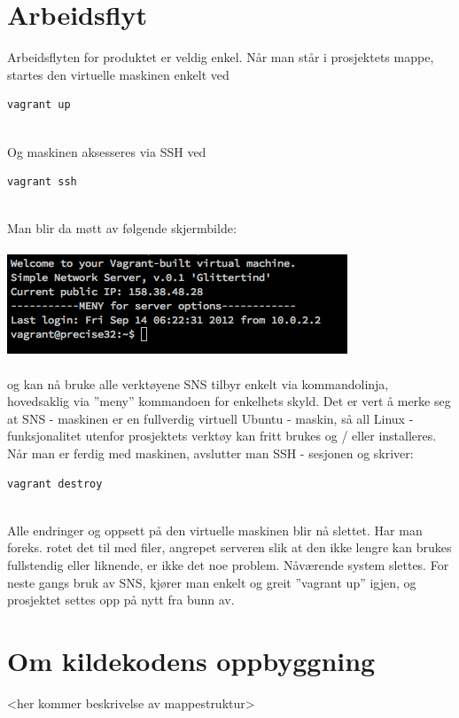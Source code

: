 \documentclass{article}
\begin{document}
\section{Arbeidsflyt}
Arbeidsflyten for produktet er veldig enkel. Når man står i prosjektets mappe, startes den virtuelle maskinen enkelt ved \\
\begin{lstlisting}
vagrant up
\end{lstlisting}
\\ 
Og maskinen aksesseres via SSH ved
\begin{lstlisting}
vagrant ssh
\end{lstlisting}
\\
Man blir da møtt av følgende skjermbilde: \\ \\
\includegraphics[scale = 0.7]{vagrantSSH.png}
\\ \\
og kan nå bruke alle verktøyene SNS tilbyr enkelt via kommandolinja, hovedsaklig via ''meny'' kommandoen for enkelhets skyld. Det er vert å merke seg at SNS - maskinen er en fullverdig virtuell Ubuntu - maskin, så all Linux - funksjonalitet utenfor prosjektets verktøy kan fritt brukes og / eller installeres. \\ 
Når man er ferdig med maskinen, avslutter man SSH - sesjonen og skriver: \\
\begin{lstlisting}
vagrant destroy
\end{lstlisting}
\\
Alle endringer og oppsett på den virtuelle maskinen blir nå slettet. Har man foreks. rotet det til med filer, angrepet serveren slik at den ikke lengre kan brukes fullstendig eller liknende, er ikke det noe problem. Nåværende system slettes. For neste gangs bruk av SNS, kjører man enkelt og greit ''vagrant up'' igjen, og prosjektet settes opp på nytt fra bunn av. 

\section{Om kildekodens oppbyggning}
<her kommer beskrivelse av mappestruktur>
\end{document}
